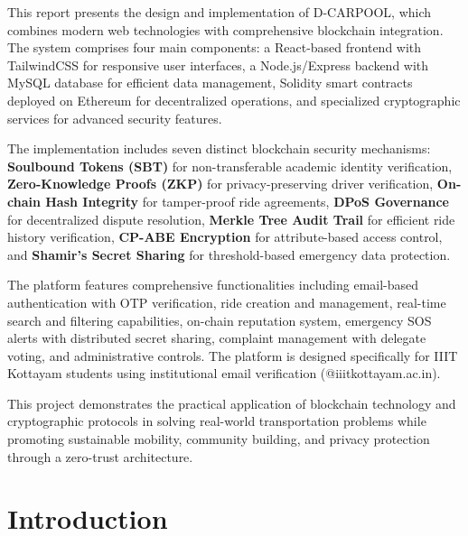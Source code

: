 \documentclass[12pt]{report}
\theoremstyle{plain}
\theoremstyle{definition}
\theoremstyle{remark}
\begin{document}
This report presents the design and implementation of D-CARPOOL, which combines modern web technologies with comprehensive blockchain integration. The system comprises four main components: a React-based frontend with TailwindCSS for responsive user interfaces, a Node.js/Express backend with MySQL database for efficient data management, Solidity smart contracts deployed on Ethereum for decentralized operations, and specialized cryptographic services for advanced security features.

The implementation includes seven distinct blockchain security mechanisms: \textbf{Soulbound Tokens (SBT)} for non-transferable academic identity verification, \textbf{Zero-Knowledge Proofs (ZKP)} for privacy-preserving driver verification, \textbf{On-chain Hash Integrity} for tamper-proof ride agreements, \textbf{DPoS Governance} for decentralized dispute resolution, \textbf{Merkle Tree Audit Trail} for efficient ride history verification, \textbf{CP-ABE Encryption} for attribute-based access control, and \textbf{Shamir's Secret Sharing} for threshold-based emergency data protection.

The platform features comprehensive functionalities including email-based authentication with OTP verification, ride creation and management, real-time search and filtering capabilities, on-chain reputation system, emergency SOS alerts with distributed secret sharing, complaint management with delegate voting, and administrative controls. The platform is designed specifically for IIIT Kottayam students using institutional email verification (@iiitkottayam.ac.in).

This project demonstrates the practical application of blockchain technology and cryptographic protocols in solving real-world transportation problems while promoting sustainable mobility, community building, and privacy protection through a zero-trust architecture.

\clearpage

\tableofcontents
\clearpage

\listoffigures
\listoftables

\newpage

 \setcounter{page}{1}

\chapter{Introduction}
\end{document}
